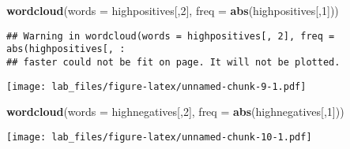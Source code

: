 \documentclass[
]{article}
\newenvironment{Shaded}{\begin{snugshade}}{\end{snugshade}}
\newcommand{\DataTypeTok}[1]{\textcolor[rgb]{0.13,0.29,0.53}{#1}}
\newcommand{\DecValTok}[1]{\textcolor[rgb]{0.00,0.00,0.81}{#1}}
\newcommand{\KeywordTok}[1]{\textcolor[rgb]{0.13,0.29,0.53}{\textbf{#1}}}
\newcommand{\NormalTok}[1]{#1}
\begin{document}
\begin{Shaded}
\begin{Highlighting}[]
\KeywordTok{wordcloud}\NormalTok{(}\DataTypeTok{words =}\NormalTok{ highpositives[,}\DecValTok{2}\NormalTok{], }\DataTypeTok{freq =} \KeywordTok{abs}\NormalTok{(highpositives[,}\DecValTok{1}\NormalTok{]))}
\end{Highlighting}
\end{Shaded}

\begin{verbatim}
## Warning in wordcloud(words = highpositives[, 2], freq = abs(highpositives[, :
## faster could not be fit on page. It will not be plotted.
\end{verbatim}

\texttt{[image: lab\_files/figure-latex/unnamed-chunk-9-1.pdf]}

\begin{Shaded}
\begin{Highlighting}[]
\KeywordTok{wordcloud}\NormalTok{(}\DataTypeTok{words =}\NormalTok{ highnegatives[,}\DecValTok{2}\NormalTok{], }\DataTypeTok{freq =} \KeywordTok{abs}\NormalTok{(highnegatives[,}\DecValTok{1}\NormalTok{]))}
\end{Highlighting}
\end{Shaded}

\texttt{[image: lab\_files/figure-latex/unnamed-chunk-10-1.pdf]}
\end{document}
